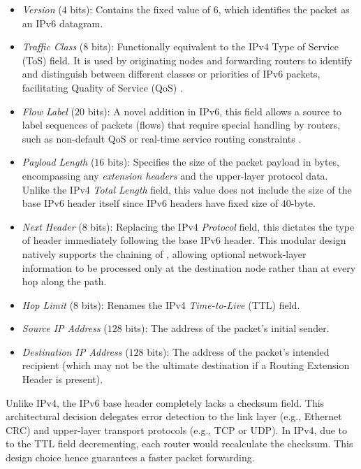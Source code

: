 \begin{itemize}
    \item \emph{Version} (\(4\) bits): Contains the fixed value of \(6\), which identifies the packet as an IPv6 datagram.
    \item \emph{Traffic Class} (\(8\) bits): Functionally equivalent to the IPv4 Type of Service (ToS) field. It is used by originating nodes and forwarding routers to identify and distinguish between different classes or priorities of IPv6 packets, facilitating Quality of Service (QoS) \cite{rfc8200}.
    \item \emph{Flow Label} (\(20\) bits): A novel addition in IPv6, this field allows a source to label sequences of packets (flows) that require special handling by routers, such as non-default QoS or real-time service routing constraints \cite{rfc6437}.
    \item \emph{Payload Length} (\(16\) bits): Specifies the size of the packet payload in bytes, encompassing any \emph{extension headers} and the upper-layer protocol data. Unlike the IPv4 \emph{Total Length} field, this value does not include the size of the base IPv6 header itself since IPv6 headers have fixed size of \(40\)-byte.
    \item \emph{Next Header} (\(8\) bits): Replacing the IPv4 \emph{Protocol} field, this dictates the type of header immediately following the base IPv6 header. This modular design natively supports the chaining of , allowing optional network-layer information to be processed only at the destination node rather than at every hop along the path.
    \item \emph{Hop Limit} (\(8\) bits): Renames the IPv4 \emph{Time-to-Live} (TTL) field.
    \item \emph{Source IP Address} (\(128\) bits): The address of the packet's initial sender.
    \item \emph{Destination IP Address} (\(128\) bits): The address of the packet's intended recipient (which may not be the ultimate destination if a Routing Extension Header is present).
\end{itemize}

Unlike IPv4, the IPv6 base header completely lacks a checksum field. This architectural decision delegates error detection to the link layer (e.g., Ethernet CRC) and upper-layer transport protocols (e.g., TCP or UDP).
In IPv4, due to to the TTL field decrementing, each router would recalculate the checksum. This design choice hence guarantees a faster packet forwarding.

